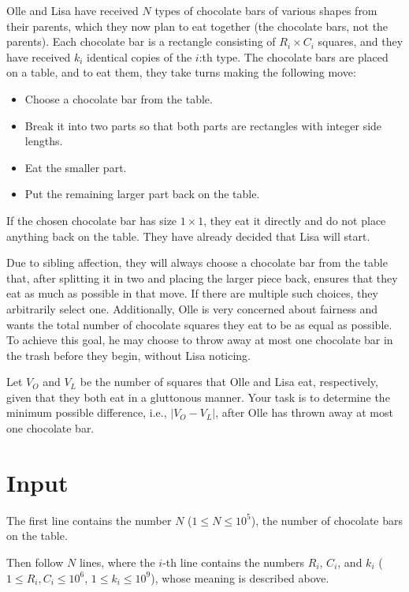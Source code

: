 
\noindent
Olle and Lisa have received $N$ types of chocolate bars of various shapes from their parents, which they
now plan to eat together (the chocolate bars, not the parents). Each chocolate bar is a rectangle consisting
of $R_i \times C_i$ squares, and they have received $k_i$ identical copies of the $i$:th type.
The chocolate bars are placed on a table, and to eat them, they take turns making the following move:  
\begin{itemize}
  \item Choose a chocolate bar from the table.
  \item Break it into two parts so that both parts are rectangles with integer side lengths.
  \item Eat the smaller part.
  \item Put the remaining larger part back on the table.
\end{itemize}
If the chosen chocolate bar has size $1 \times 1$, they eat it directly and do not place anything back on the table.  
They have already decided that Lisa will start.  

Due to sibling affection, they will always choose a chocolate bar from the table that,  
after splitting it in two and placing the larger piece back,  
ensures that they eat as much as possible in that move.  
If there are multiple such choices, they arbitrarily select one.  
Additionally, Olle is very concerned about fairness and wants the total number of chocolate squares they eat to be as
equal as possible. To achieve this goal, he may choose to throw away at most one chocolate bar in the trash before they
begin, without Lisa noticing.  

Let $V_O$ and $V_L$ be the number of squares that Olle and Lisa eat, respectively,  
given that they both eat in a gluttonous manner.  
Your task is to determine the minimum possible difference, i.e., $|V_O - V_L|$,  
after Olle has thrown away at most one chocolate bar.  

\section*{Input}
The first line contains the number $N$ ($1 \leq N \leq 10^5$), the number of chocolate bars on the table.

Then follow $N$ lines, where the $i$-th line contains the numbers $R_i$, $C_i$, and
$k_i$ ($1 \leq R_i, C_i \leq 10^6$, $1 \leq k_i \leq 10^9$), whose meaning is described above.

